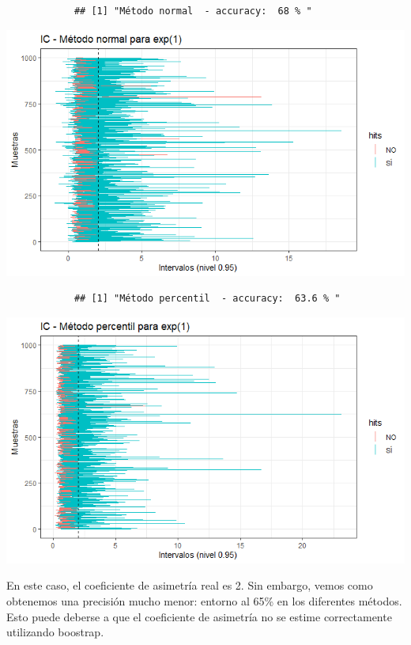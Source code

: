 \documentclass[a4paper]{article}
\begin{document}
		\begin{verbatim}
			## [1] "Método normal  - accuracy:  68 % "
		\end{verbatim}
		
		\includegraphics{figures/exp2.png}
		
		\begin{verbatim}
			## [1] "Método percentil  - accuracy:  63.6 % "
		\end{verbatim}
		
		\includegraphics{figures/exp3.png}
		
		En este caso, el coeficiente de asimetría real es 2. Sin embargo, vemos
		como obtenemos una precisión mucho menor: entorno al 65\% en los
		diferentes métodos. Esto puede deberse a que el coeficiente de asimetría
		no se estime correctamente utilizando boostrap.
\end{document}

